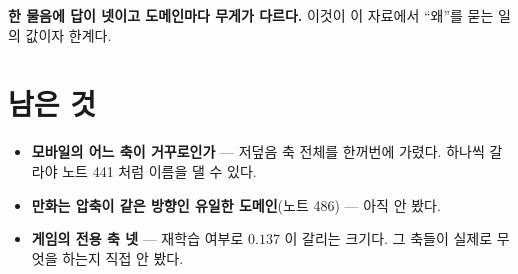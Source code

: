 \documentclass[11pt]{article}
\begin{document}
\textbf{한 물음에 답이 넷이고 도메인마다 무게가 다르다.} 이것이 이
자료에서 ``왜''를 묻는 일의 값이자 한계다.

\section*{남은 것}

\begin{itemize}
\item \textbf{모바일의 어느 축이 거꾸로인가} --- 저덮음 축 전체를 한꺼번에
가렸다. 하나씩 갈라야 노트 441 처럼 이름을 댈 수 있다.
\item \textbf{만화는 압축이 같은 방향인 유일한 도메인}(노트 486) --- 아직
안 봤다.
\item \textbf{게임의 전용 축 넷} --- 재학습 여부로 $0.137$ 이 갈리는
크기다. 그 축들이 실제로 무엇을 하는지 직접 안 봤다.
\end{itemize}
\end{document}
